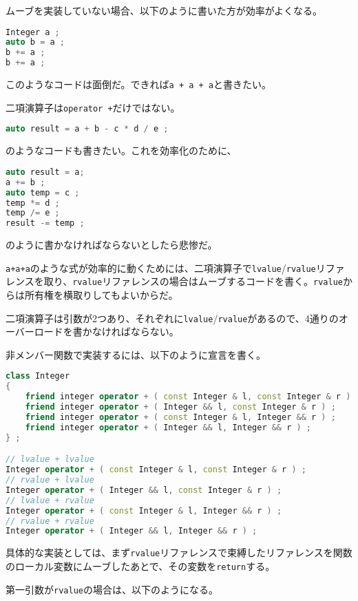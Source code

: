 ムーブを実装していない場合、以下のように書いた方が効率がよくなる。

\begin{lstlisting}[language={C++}]
Integer a ;
auto b = a ;
b += a ;
b += a ;
\end{lstlisting}

このようなコードは面倒だ。できれば\texttt{a + a + a}と書きたい。

\ifTombow\pagebreak\fi
二項演算子は\texttt{operator +}だけではない。

\begin{lstlisting}[language={C++}]
auto result = a + b - c * d / e ;
\end{lstlisting}
のようなコードも書きたい。これを効率化のために、
\begin{lstlisting}[language={C++}]
auto result = a;
a += b ;
auto temp = c ;
temp *= d ;
temp /= e ;
result -= temp ;
\end{lstlisting}
のように書かなければならないとしたら悲惨だ。

\texttt{a+a+a}のような式が効率的に動くためには、二項演算子で\texttt{lvalue}/\texttt{rvalue}リファレンスを取り、\texttt{rvalue}リファレンスの場合はムーブするコードを書く。\texttt{rvalue}からは所有権を横取りしてもよいからだ。

二項演算子は引数が2つあり、それぞれに\texttt{lvalue}/\texttt{rvalue}があるので、4通りのオーバーロードを書かなければならない。

非メンバー関数で実装するには、以下のように宣言を書く。

\begin{lstlisting}[language={C++}]
class Integer 
{
    friend integer operator + ( const Integer & l, const Integer & r ) ;
    friend integer operator + ( Integer && l, const Integer & r ) ;
    friend integer operator + ( const Integer & l, Integer && r ) ;
    friend integer operator + ( Integer && l, Integer && r ) ;
} ;

// lvalue + lvalue
Integer operator + ( const Integer & l, const Integer & r ) ;
// rvalue + lvalue
Integer operator + ( Integer && l, const Integer & r ) ;
// lvalue + rvalue
Integer operator + ( const Integer & l, Integer && r ) ;
// rvalue + rvalue
Integer operator + ( Integer && l, Integer && r ) ;
\end{lstlisting}

具体的な実装としては、まず\texttt{rvalue}リファレンスで束縛したリファレンスを関数のローカル変数にムーブしたあとで、その変数を\texttt{return}する。

\ifTombow\pagebreak\fi
第一引数が\texttt{rvalue}の場合は、以下のようになる。

